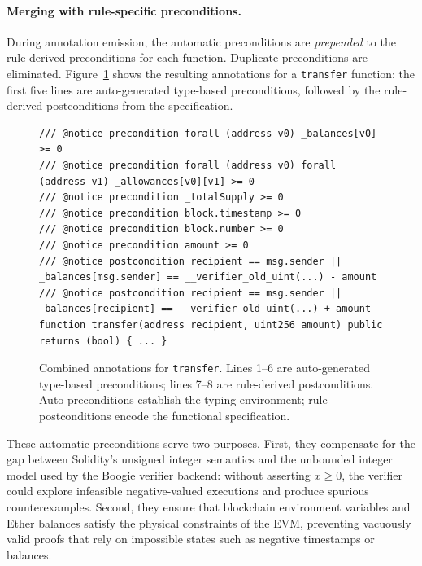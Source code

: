 \paragraph{Merging with rule-specific preconditions.}
During annotation emission, the automatic preconditions are \emph{prepended} to the rule-derived preconditions for each function. Duplicate preconditions are eliminated. Figure~\ref{fig:auto-precond-example} shows the resulting annotations for a \texttt{transfer} function: the first five lines are auto-generated type-based preconditions, followed by the rule-derived postconditions from the specification.

\begin{figure}[h]
\centering
\begin{lstlisting}[style=solstyle]
/// @notice precondition forall (address v0) _balances[v0] >= 0
/// @notice precondition forall (address v0) forall (address v1) _allowances[v0][v1] >= 0
/// @notice precondition _totalSupply >= 0
/// @notice precondition block.timestamp >= 0
/// @notice precondition block.number >= 0
/// @notice precondition amount >= 0
/// @notice postcondition recipient == msg.sender || _balances[msg.sender] == __verifier_old_uint(...) - amount
/// @notice postcondition recipient == msg.sender || _balances[recipient] == __verifier_old_uint(...) + amount
function transfer(address recipient, uint256 amount) public returns (bool) { ... }
\end{lstlisting}
\caption{Combined annotations for \texttt{transfer}. Lines 1--6 are auto-generated type-based preconditions; lines 7--8 are rule-derived postconditions. Auto-preconditions establish the typing environment; rule postconditions encode the functional specification.}
\label{fig:auto-precond-example}
\end{figure}

These automatic preconditions serve two purposes. First, they compensate for the gap between Solidity's unsigned integer semantics and the unbounded integer model used by the Boogie verifier backend: without asserting $x \geq 0$, the verifier could explore infeasible negative-valued executions and produce spurious counterexamples. Second, they ensure that blockchain environment variables and Ether balances satisfy the physical constraints of the EVM, preventing vacuously valid proofs that rely on impossible states such as negative timestamps or balances.
